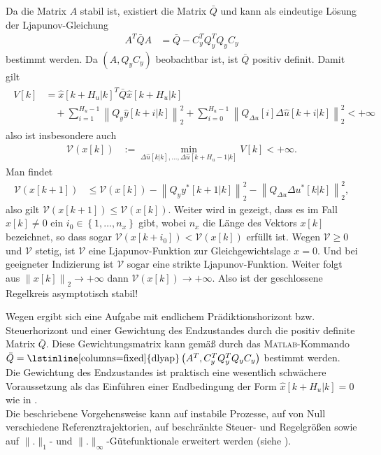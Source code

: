 Da die Matrix $A$ stabil ist, existiert die Matrix $\bar{Q}$ und kann als eindeutige Lösung der Ljapunov-Gleichung
\begin{align}
	A^T\bar{Q}A & = \bar{Q}-C_y^TQ_y^TQ_yC_y \label{eqn:kap_4_ljapunov_glg}
\end{align}
bestimmt werden. Da $(A,Q_yC_y)$ beobachtbar ist, ist $\bar{Q}$ positiv definit. Damit gilt
\begin{align}
\begin{split}\label{eqn:kap_4_guetefunktional_bedingung}
	V[k] & = \hat{x}[k+H_u|k]^T\bar{Q}\hat{x}[k+H_u|k]\\
	& \quad + \sum\limits_{i=1}^{H_u-1}\left\| Q_y\hat{y}[k+i|k]\right\|_2^2+\sum\limits_{i=0}^{H_u-1}\left\| Q_{\Delta u}[i]\Delta \hat{u}[k+i|k]\right\|_2^2 < +\infty  
\end{split}
\end{align}
also ist insbesondere auch
\begin{align}
	\mathcal{V}(x[k]) & := \min\limits_{\Delta\hat{u}[k|k],\ldots,\Delta\hat{u}[k+H_u-1|k]}V[k] < +\infty.
\end{align}
Man findet 
\begin{align*}
	\mathcal{V}(x[k+1]) & \le \mathcal{V}(x[k])-\left\| Q_y y^{\ast}[k+1|k]\right\|_2^2-\left\| Q_{\Delta u}\Delta u^{\ast}[k|k]\right\|_2^2,
\end{align*}
also gilt $\mathcal{V}(x[k+1])\le \mathcal{V}(x[k])$. Weiter wird in \cite{Maciejowski2002} gezeigt, dass es im Fall $x[k]\neq 0$ ein $i_0\in\left\{ 1,\ldots,n_x \right\}$ gibt, wobei
$n_x$ die Länge des Vektors $x[k]$ bezeichnet, so dass sogar $\mathcal{V}(x[k+i_0])<\mathcal{V}(x[k])$ erfüllt ist. Wegen $\mathcal{V}\ge 0$ und $\mathcal{V}$ stetig, ist $\mathcal{V}$ eine
Ljapunov-Funktion zur Gleichgewichtslage $x=0$. Und bei geeigneter Indizierung ist $\mathcal{V}$ sogar eine strikte Ljapunov-Funktion. Weiter folgt aus $\left\| x[k]
\right\|_2\rightarrow+\infty$ dann $\mathcal{V}(x[k])\rightarrow +\infty$. Also ist der geschlossene Regelkreis asymptotisch stabil!
\begin{remark}
Wegen  ergibt sich eine Aufgabe mit endlichem Prädiktionshorizont bzw. Steuerhorizont und einer Gewichtung des Endzustandes durch die
positiv definite Matrix $\bar{Q}$. Diese Gewichtungsmatrix kann gemäß  durch das \textsc{Matlab}-Kommando
$\bar{Q}=\text{\lstinline[columns=fixed]{dlyap}}\left(A^T,C_y^TQ_y^TQ_yC_y\right)$ bestimmt werden. Die Gewichtung des Endzustandes ist praktisch eine wesentlich schwächere
Voraussetzung als das Einführen einer Endbedingung der Form $\hat{x}[k+H_u|k]=0$ wie in .\\
Die beschriebene Vorgehensweise kann auf instabile Prozesse, auf von Null verschiedene Referenztrajektorien, auf beschränkte Steuer- und Regelgrößen sowie auf $\|.\|_1$- und
$\|.\|_{\infty}$-Gütefunktionale erweitert werden (siehe \cite{Maciejowski2002}).
\end{remark}
